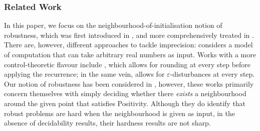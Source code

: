 \subsubsection*{Related Work} 
In this paper, we focus on the neighbourhood-of-initialisation notion of robustness, which was first introduced in \cite{originalstacs}, and more comprehensively treated in \cite{originalarxiv}. There are, however, different approaches to tackle imprecision: \cite{N21} considers a model of computation that can take arbitrary real numbers as input. Works with a more control-theoretic flavour include \cite{rounding20}, which allows for rounding at every step before applying the recurrence; in the same vein, \cite{pseudo21} allows for $\varepsilon$-disturbances at every step. Our notion of robustness has been considered in \cite{originalstacs,originalarxiv,pseudo21}, however, these works primarily concern themselves with simply deciding whether there \textit{exists} a neighbourhood around the given point that satisfies Positivity. Although they do identify that robust problems are hard when the neighbourhood is given as input, in the absence of decidability results, their hardness results are not sharp.

